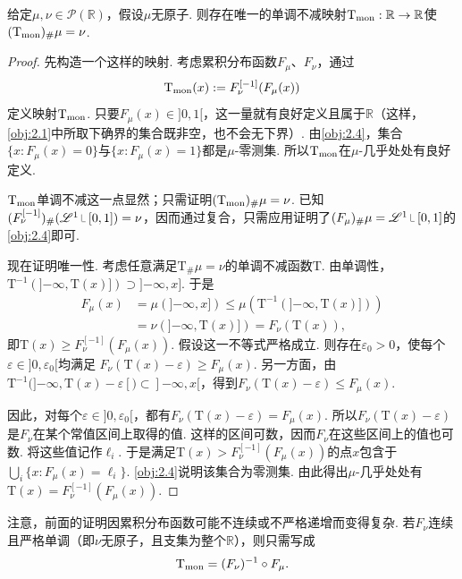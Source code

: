 \begin{theorem}\label{obj:2.5}
给定$\mu,\nu\in\mathscr P(\mathbb R)$，假设$\mu$无原子. 则存在唯一的单调不减映射$\mathrm T_{\rm mon}:\mathbb R\to\mathbb R$使$(\mathrm T_{\rm mon})_\#\mu=\nu$.
\end{theorem}
\begin{proof}
先构造一个这样的映射. 考虑累积分布函数$F_\mu$、$F_\nu$，通过
\[
\mathrm T_{\rm mon}(x):=F_\nu^{[-1]}(F_\mu(x))
\]
定义映射$\mathrm T_{\rm mon}$. 只要$F_\mu(x)\in]0,1[$，这一量就有良好定义且属于$\mathbb R$（这样，\autoref{obj:2.1}中所取下确界的集合既非空，也不会无下界）. 由\autoref{obj:2.4}，集合$\{x:F_\mu(x)=0\}$与$\{x:F_\mu(x)=1\}$都是$\mu$-零测集. 所以$\mathrm T_{\rm mon}$在$\mu$-几乎处处有良好定义.

$\mathrm T_{\rm mon}$单调不减这一点显然；只需证明$(\mathrm T_{\rm mon})_\#\mu=\nu$. 已知$(F_\nu^{[-1]})_\#(\mathscr L^1\restr[0,1])=\nu$，因而通过复合，只需应用证明了$(F_\mu)_\#\mu=\mathscr L^1\restr[0,1]$的\autoref{obj:2.4}即可.

现在证明唯一性. 考虑任意满足$\mathrm T_\#\mu=\nu$的单调不减函数$\mathrm T$. 由单调性，
$\mathrm T^{-1}(]{-\infty},\mathrm T(x)])\supset]{-\infty},x]$. 于是
\[
\begin{aligned}
F_\mu(x)&=\mu(]{-\infty},x])
\le\mu(\mathrm T^{-1}(]{-\infty},\mathrm T(x)]))\\
&=\nu(]{-\infty},\mathrm T(x)])=F_\nu(\mathrm T(x)),
\end{aligned}
\]
即$\mathrm T(x)\ge F_\nu^{[-1]}(F_\mu(x))$. 假设这一不等式严格成立. 则存在$\varepsilon_0>0$，使每个$\varepsilon\in]0,\varepsilon_0[$均满足
$F_\nu(\mathrm T(x)-\varepsilon)\ge F_\mu(x)$. 另一方面，由
$\mathrm T^{-1}(]{-\infty},\mathrm T(x)-\varepsilon[)\subset]{-\infty},x[$，得到$F_\nu(\mathrm T(x)-\varepsilon)\le F_\mu(x)$.

因此，对每个$\varepsilon\in]0,\varepsilon_0[$，都有$F_\nu(\mathrm T(x)-\varepsilon)=F_\mu(x)$. 所以$F_\nu(\mathrm T(x)-\varepsilon)$是$F_\nu$在某个常值区间上取得的值. 这样的区间可数，因而$F_\nu$在这些区间上的值也可数. 将这些值记作$\ell_i$. 于是满足$\mathrm T(x)>F_\nu^{[-1]}(F_\mu(x))$的点$x$包含于$\bigcup_i\{x:F_\mu(x)=\ell_i\}$. \autoref{obj:2.4}说明该集合为零测集. 由此得出$\mu$-几乎处处有$\mathrm T(x)=F_\nu^{[-1]}(F_\mu(x))$.
\end{proof}

\begin{remark}\label{obj:2.6}
注意，前面的证明因累积分布函数可能不连续或不严格递增而变得复杂. 若$F_\nu$连续且严格单调（即$\nu$无原子，且支集为整个$\mathbb R$），则只需写成
\[
\mathrm T_{\rm mon}=(F_\nu)^{-1}\circ F_\mu.
\]
\end{remark}

